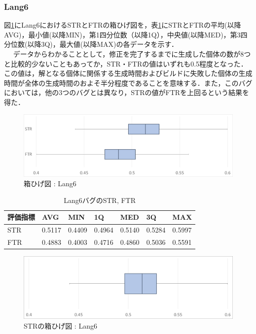 \documentclass[uplatex,dvipdfmx,a4paper]{jsarticle}
\begin{document}
\subsubsection{Lang6}
図\ref{fig:Lang6_boxplot}にLang6におけるSTRとFTRの箱ひげ図を，表\ref{tab:Lang6}にSTRとFTRの平均(以降AVG)，最小値(以降MIN)，第1四分位数（以降1Q），中央値(以降MED)，第3四分位数(以降3Q)，最大値(以降MAX)の各データを示す．\\　
データからわかることとして，修正を完了するまでに生成した個体の数が8つと比較的少ないこともあってか，STR・FTRの値はいずれも0.5程度となった．この値は，解となる個体に関係する生成時間およびビルドに失敗した個体の生成時間が全体の生成時間のおよそ半分程度であることを意味する．また，このバグにおいては，他の3つのバグとは異なり，STRの値がFTRを上回るという結果を得た．
\begin{figure}[t]
  \centering
  \includegraphics[width=\linewidth]{fig/Lang6_boxplot.png}
  \caption{箱ひげ図 : Lang6}
  \label{fig:Lang6_boxplot}
\end{figure}
\begin{table}[b]
  \centering
  \caption{Lang6バグのSTR, FTR}
  \label{tab:Lang6}
  \begin{tabular}{l|llllll} \hline\hline
    評価指標 & AVG         & MIN & 1Q & MED & 3Q & MAX   \\\hline
    STR & 0.5117 & 0.4409 & 0.4964 & 0.5140 & 0.5284 & 0.5997  \\
    FTR & 0.4883 & 0.4003 & 0.4716 & 0.4860 & 0.5036 & 0.5591 \\\hline\hline
  \end{tabular}
\end{table}
\begin{figure}[t]
  \centering
  \includegraphics[width=\linewidth]{fig/Lang6_boxplot_STR.png}
  \caption{STRの箱ひげ図 : Lang6}
  \label{fig:Lang6_boxplot_STR}
\end{figure}
\end{document}
